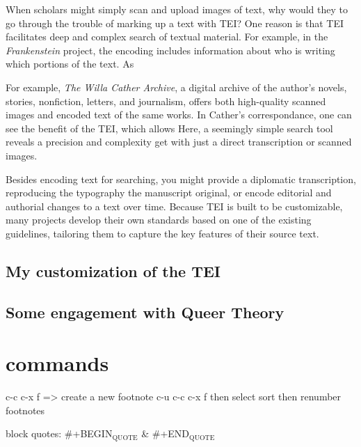 \documentclass[11pt]{article}
\begin{document}
When scholars might simply scan and upload images of text, why would
they to go through the trouble of marking up a text with TEI? One
reason is that TEI facilitates deep and complex search of textual
material. For example, in the \emph{Frankenstein} project, the encoding
includes information about who is writing which portions of the
text. As 


For example, \emph{The Willa Cather Archive}, a digital archive
of the author's novels, stories, nonfiction, letters, and journalism,
offers both high-quality scanned images and encoded text of the same
works. In Cather's correspondance, one can see the benefit of the
TEI, which allows Here, a seemingly simple search tool reveals a precision and
complexity get with just a direct transcription or
scanned images.

Besides encoding text for searching, you might provide a diplomatic transcription, reproducing the typography the manuscript original, or encode editorial and authorial changes to a text over time. Because TEI is built to be customizable, many projects develop their own standards based on one of the existing guidelines, tailoring them to capture the key features of their source text.

\subsection{My customization of the TEI}
\label{sec:orge0e273e}
\subsection{Some engagement with Queer Theory}
\label{sec:orgf774655}
\section{commands}
\label{sec:orga6ef030}
c-c c-x f => create a new footnote
c-u c-c c-x f then select sort then renumber footnotes

block quotes: \#+BEGIN\(_{\text{QUOTE}}\) \& \#+END\(_{\text{QUOTE}}\)
\end{document}
